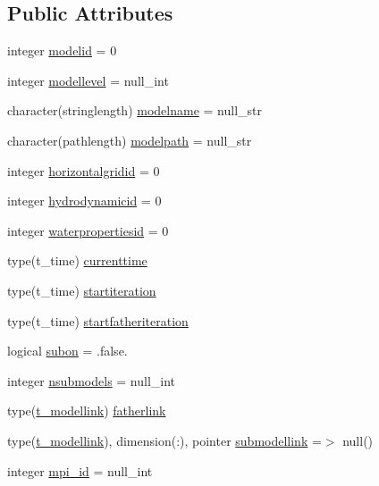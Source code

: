 \subsection*{Public Attributes}
\begin{DoxyCompactItemize}
\item 
integer \mbox{\hyperlink{structt__mohidwater_a0a359fc3c055701adbb7e8924400a058}{modelid}} = 0
\item 
integer \mbox{\hyperlink{structt__mohidwater_a18b052f877e26c5149ebdc7eeb512a6f}{modellevel}} = null\+\_\+int
\item 
character(stringlength) \mbox{\hyperlink{structt__mohidwater_a2fa81df78e121e3d3d3ed86c7418baed}{modelname}} = null\+\_\+str
\item 
character(pathlength) \mbox{\hyperlink{structt__mohidwater_a708b382221db444db0db8be56ef6217c}{modelpath}} = null\+\_\+str
\item 
integer \mbox{\hyperlink{structt__mohidwater_a4a8a8808c3467535ecae11691f593018}{horizontalgridid}} = 0
\item 
integer \mbox{\hyperlink{structt__mohidwater_a4f6e51cfb614f1053e52922042b9e216}{hydrodynamicid}} = 0
\item 
integer \mbox{\hyperlink{structt__mohidwater_a7357bc7c465189d816f7e9b274f28f3b}{waterpropertiesid}} = 0
\item 
type(t\+\_\+time) \mbox{\hyperlink{structt__mohidwater_a18a3fa1f7da7d0ce0da21d5a3684a5c3}{currenttime}}
\item 
type(t\+\_\+time) \mbox{\hyperlink{structt__mohidwater_ac39517ef24d9f66cdbb955c318815dbe}{startiteration}}
\item 
type(t\+\_\+time) \mbox{\hyperlink{structt__mohidwater_aa1feffefbd0a0e77cdb39c0ade0fd00b}{startfatheriteration}}
\item 
logical \mbox{\hyperlink{structt__mohidwater_a819a96f8e0e8111541b690cae104cedf}{subon}} = .false.
\item 
integer \mbox{\hyperlink{structt__mohidwater_afc22070230ff950c49fcbb74e2ba3907}{nsubmodels}} = null\+\_\+int
\item 
type(\mbox{\hyperlink{structt__modellink}{t\+\_\+modellink}}) \mbox{\hyperlink{structt__mohidwater_aeea42ebf091eb3739f37bb7989889070}{fatherlink}}
\item 
type(\mbox{\hyperlink{structt__modellink}{t\+\_\+modellink}}), dimension(\+:), pointer \mbox{\hyperlink{structt__mohidwater_a45145584a628f0b4c8a57bcecb69e528}{submodellink}} =$>$ null()
\item 
integer \mbox{\hyperlink{structt__mohidwater_a54126fcc689790d742a67920acb370fb}{mpi\+\_\+id}} = null\+\_\+int

\end{DoxyCompactItemize}
